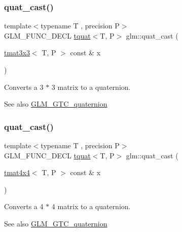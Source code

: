 \subsubsection{\texorpdfstring{quat\+\_\+cast()}{quat\_cast()}\hspace{0.1cm}{\footnotesize\ttfamily [1/2]}}
{\footnotesize\ttfamily template$<$typename T , precision P$>$ \\
G\+L\+M\+\_\+\+F\+U\+N\+C\+\_\+\+D\+E\+CL \hyperlink{structglm_1_1tquat}{tquat}$<$T, P$>$ glm\+::quat\+\_\+cast (\begin{DoxyParamCaption}\item[{\hyperlink{structglm_1_1tmat3x3}{tmat3x3}$<$ T, P $>$ const \&}]{x }\end{DoxyParamCaption})}

Converts a 3 $\ast$ 3 matrix to a quaternion.

\begin{DoxySeeAlso}{See also}
\hyperlink{group__gtc__quaternion}{G\+L\+M\+\_\+\+G\+T\+C\+\_\+quaternion} 
\end{DoxySeeAlso}
\mbox{\label{group__gtc__quaternion_ga3e4615e9884dd0f41f5617b9848a5d9c}} 
\subsubsection{\texorpdfstring{quat\+\_\+cast()}{quat\_cast()}\hspace{0.1cm}{\footnotesize\ttfamily [2/2]}}
{\footnotesize\ttfamily template$<$typename T , precision P$>$ \\
G\+L\+M\+\_\+\+F\+U\+N\+C\+\_\+\+D\+E\+CL \hyperlink{structglm_1_1tquat}{tquat}$<$T, P$>$ glm\+::quat\+\_\+cast (\begin{DoxyParamCaption}\item[{\hyperlink{structglm_1_1tmat4x4}{tmat4x4}$<$ T, P $>$ const \&}]{x }\end{DoxyParamCaption})}

Converts a 4 $\ast$ 4 matrix to a quaternion.

\begin{DoxySeeAlso}{See also}
\hyperlink{group__gtc__quaternion}{G\+L\+M\+\_\+\+G\+T\+C\+\_\+quaternion} 
\end{DoxySeeAlso}
\mbox{\label{group__gtc__quaternion_ga4fd705376c6c1fd667be0055a0ea58ec}} 
